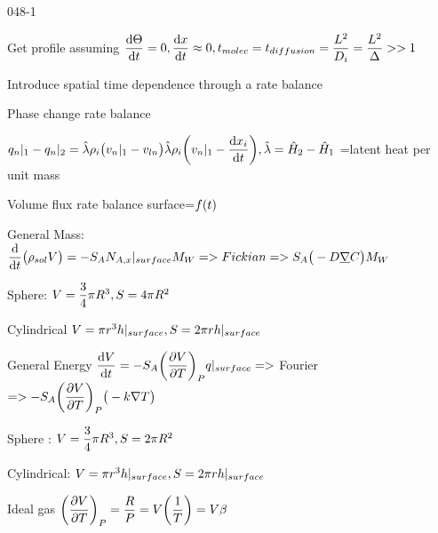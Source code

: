 \begin{mitframe}{048-1}
\begin{listone}
		\item Get profile assuming $\dfrac{\mathrm{d}\dimltemp}{\mathrm{d}{t}}=0, \dfrac{\mathrm{d}\disp}{\mathrm{d}{t}}\approx{0}, t_{molec}=t_{diffusion}=\dfrac{\length^2}{\pdiff}=\dfrac{\length^2}{\iipf}>>1$
        \item Introduce spatial time dependence through a rate balance
        \item Phase change rate balance
        \item $\heatflux_n|_1-\heatflux_n|_2=\hat{\wavel}\dens_{\state}\big(\vvel_n|_1-\vvel_{ln}\big)\hat{\wavel}\dens_{\state}\bigg(\vvel_n|_1-\dfrac{\mathrm{d}\disp_{\state}}{\mathrm{d}t}\bigg), \hat{\wavel}=\hat{\enthalpy}_2-\hat{\enthalpy}_1$ =latent heat per unit mass
        \item Volume flux rate balance surface=$\fug(t)$
       \item General Mass: $\dfrac{\mathrm{d}}{\mathrm{d}t}\big(\dens_{sol}\vol\big)=-\entropy_{\helmholtz}\nummoles_{\helmholtz,\disp}|_{surface}\mw =>Fickian=>\entropy_{\helmholtz}\big(-\elecdisplace\gradop\conc\big)\mw$
       
       		\begin{listtwo}
            		\item Sphere: $\vol=\dfrac{3}{4}\pi{R}^3, \entropy=4\pi{R}^2$
                    
                    \item Cylindrical $\vol =\pi{r}^3h|_{surface},\entropy=2\pi{r}h|_{surface} $
                           \end{listtwo}
      
       \item General Energy $\dfrac{\mathrm{d}\vol}{\mathrm{d}t}=-\entropy_{\helmholtz}\bigg(\dfrac{\partial\vol}{\partial\Temp}\bigg)_{\p}\heatflux|_{surface}=> $ Fourier$=>-\entropy_{\helmholtz}\bigg(\dfrac{\partial\vol}{\partial\Temp}\bigg)_{\p}\big(-\thermcond\nabla\Temp\big)$
			\begin{listtwo}
            		\item Sphere : $\vol =\dfrac{3}{4}\pi{R}^3,  \entropy=2\pi{R}^2$
                   \item Cylindrical: $\vol=\pi{r}^3h|_{surface},  \entropy=2\pi{r}h|_{surface}$
                    \item Ideal gas $\bigg(\dfrac{\partial\vol}{\partial\Temp}\bigg)_{\p}=\dfrac{\gasconst}{\p}=\vol\bigg(\dfrac{1}{\Temp}\bigg)=\vol\texpcoeff$
                    

\end{listtwo}
\end{listone}
\end{mitframe}
